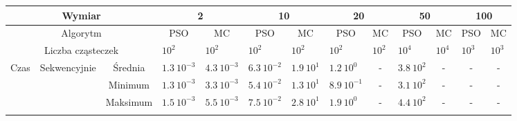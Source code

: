 \documentclass[11pt, a4paper, oneside]{article}
\begin{document}
\begin{table}[h]
\scriptsize
\begin{adjustwidth}{0cm}{}
\centering
\begin{tabular}{|c|c|c|l|l|l|l|l|c|l|c|c|c|}
\hline
\multicolumn{3}{|c|}{Wymiar}                                      & \multicolumn{2}{c|}{2}                             & \multicolumn{2}{c|}{10}                            & \multicolumn{2}{c|}{20}                                  & \multicolumn{2}{c|}{50}                                  & \multicolumn{2}{c|}{100}                                      \\ \hline
\multicolumn{3}{|c|}{Algorytm}                                    & \multicolumn{1}{c|}{PSO} & \multicolumn{1}{c|}{MC} & \multicolumn{1}{c|}{PSO} & \multicolumn{1}{c|}{MC} & \multicolumn{1}{c|}{PSO} & MC                            & \multicolumn{1}{c|}{PSO} & MC                            & PSO                           & MC                            \\ \hline
\multicolumn{3}{|c|}{Liczba cząsteczek}                           & $10^{2}$                 & $10^{2}$                & $10^{2}$                 & $10^{2}$                & $10^{2}$                 & \multicolumn{1}{l|}{$10^{2}$} & $10^{4}$                 & \multicolumn{1}{l|}{$10^{4}$} & \multicolumn{1}{l|}{$10^{3}$} & \multicolumn{1}{l|}{$10^{3}$} \\ \hline
\multirow{8}{*}{Czas} & \multirow{4}{*}{Sekwencyjnie} & Średnia   & $1.3 \ 10^{-3}$          & $4.3 \ 10^{-3}$         & $6.3 \ 10^{-2}$          & $1.9 \ 10^{1}$          & $1.2 \ 10^{0}$           & -                             & $3.8 \ 10^{2}$           & -                             & -                             & -                             \\ \cline{3-13} 
                      &                               & Minimum   & $1.3 \ 10^{-3}$          & $3.3 \ 10^{-3}$         & $5.4 \ 10^{-2}$          & $1.3 \ 10^{1}$          & $8.9 \ 10^{-1}$          & -                             & $3.1 \ 10^{2}$           & -                             & -                             & -                             \\ \cline{3-13} 
                      &                               & Maksimum  & $1.5 \ 10^{-3}$          & $5.5 \ 10^{-3}$         & $7.5 \ 10^{-2}$          & $2.8 \ 10^{1}$          & $1.9 \ 10^{0}$           & -                             & $4.4 \ 10^{2}$           & -                             & -                             & -                             \\ \cline{3-13} 

\end{tabular}
\end{adjustwidth}
\end{table}
\end{document}
